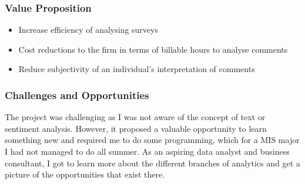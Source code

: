 \documentclass[11pt]{article}
\providecommand{\tightlist}{%
      \setlength{\itemsep}{0pt}\setlength{\parskip}{0pt}}
\begin{document}
    \subsubsection{Value Proposition}\label{value-proposition}

\begin{itemize}
\tightlist
\item
  Increase efficiency of analysing surveys
\item
  Cost reductions to the firm in terms of billable hours to analyse
  comments
\item
  Reduce subjectivity of an individual's interpretation of comments
\end{itemize}

    \subsubsection{Challenges and
Opportunities}\label{challenges-and-opportunities}

The project was challenging as I was not aware of the concept of text or
sentiment analysis. However, it proposed a valuable opportunity to learn
something new and required me to do some programming, which for a MIS
major I had not managed to do all summer. As an aspiring data analyst
and business consultant, I got to learn more about the different
branches of analytics and get a picture of the opportunities that exist
there.


    
    
    
    
\end{document}
